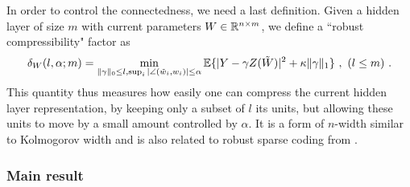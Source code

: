 In order to control the connectedness, we need a last definition. Given a 
hidden layer of size $m$ with current parameters $W \in {\mathbb{R}}^{n \times m}$, we define a
``robust compressibility" factor as 
\begin{equation}
\label{compress}
\delta_W(l, \alpha; m) = \min_{ \|\gamma \|_0 \leq l, \sup_i |\angle(\tilde{w}_i, w_i)| \leq \alpha} {\mathbb{E}} \{| Y - \gamma Z(\tilde{W}) |^2 + \kappa \| \gamma \|_1  \}~,~(l \leq m)~.
\end{equation} 
This quantity thus measures how easily one can compress the current hidden layer representation, 
by keeping only a subset of $l$ its units, but allowing these units to move by a small amount controlled by $\alpha$. It is a form 
of $n$-width similar to Kolmogorov width \cite{donoho2006compressed} and is also related to robust sparse coding from \cite{tang2013compressed, ekanadham2011recovery}.


\subsubsection{Main result}


